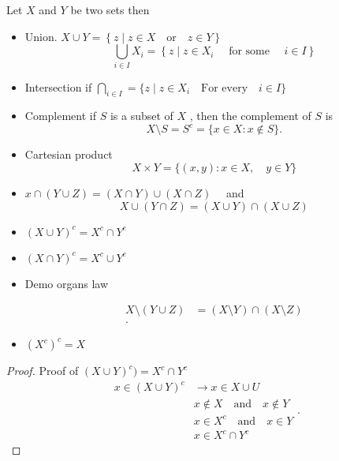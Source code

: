 \documentclass{article}
\theoremstyle{remark}
\begin{document}
\begin{definition}
  Let $X$ and $Y$ be two sets then
  \begin{itemize}
    \item Union. $X \cup Y = \left\{ z  \mid z \in X \quad \text{or} \quad  z \in Y     \right\}$ 
      \[
      \bigcup_{i \in  I}  X_{i} = \left\{ z  \mid z \in X_{i} \quad   \text{ for some } \quad   i \in I \right\}
      \] 
    \item Intersection if $\bigcap_{i \in  I}  = \{ z  \mid z \in X_i \quad \text{For every} \quad  i \in I  \} $
    \item Complement if $S$ is a subset of $X$ , then the complement of $S$ is \[
    X \setminus S = S^{c} = \{ x \in X: x \not\in S\} .
    \] 
  \item Cartesian product \[
  X \times  Y = \{ \left( x,y \right) : x \in X , \quad   y \in Y\}  
  \] 
  \end{itemize}
\end{definition}


\begin{lemma}
  \begin{itemize}
    \item $x \cap \left( Y \cup Z \right) = \left( X \cap Y \right) \cup \left( X \cap Z \right) \quad   $  and \[
    X \cup \left( Y \cap Z \right) = \left( X \cup Y \right) \cap \left( X \cup Z \right)
    \] 
  \item $\left( X \cup Y \right)^{c} = X^{c} \cap Y^{c}$
  \item $\left( X \cap Y \right)^{c} = X^{c} \cup Y^{c}$
  \item Demo organs law 

    \begin{align*}
      X \setminus \left( Y \cup Z \right) &= \left( X \setminus Y\right) \cap \left( X \setminus Z \right) \\
    .\end{align*}
  \item $\left( X^{c} \right)^{c} = X$
  \end{itemize}
\end{lemma}

\begin{proof}
  Proof of $\left( X \cup Y \right)^{c} ) =  X^{c} \cap Y^{c}$
  \begin{equation*}
    \begin{split}
      x \in \left( X \cup Y \right)^{c} & \to x \in X \cup U\\
       & x \not\in X \quad \text{and} \quad  x \not\in Y \\
       & x \in X^{c} \quad \text{and} \quad  x \in Y \\
       & x \in X^{c} \cap Y^{c}
    \end{split}
  .\end{equation*}
\end{proof}
\end{document}
